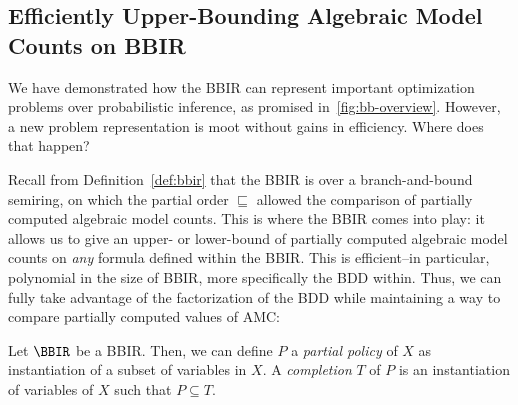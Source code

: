 \subsection{Efficiently Upper-Bounding Algebraic Model Counts on BBIR}
\label{subsec:bounds}

We have demonstrated how the BBIR can represent important optimization problems
over probabilistic inference, as promised in~\cref{fig:bb-overview}.
However, a new problem representation
is moot without
gains in efficiency. Where does that happen?

Recall from Definition~\ref{def:bbir}
that the BBIR is over a branch-and-bound semiring, on which the
partial order $\sqsubseteq$ allowed the comparison of partially computed
algebraic model counts.
This is where the BBIR comes into play: it allows us to give an
upper- or lower-bound of partially computed algebraic model counts
on \textit{any} formula defined within the BBIR.
This is efficient--in particular, polynomial in the size of BBIR, more specifically
the BDD within. Thus, we can fully take advantage of the factorization of the
BDD while maintaining a way to compare partially computed values of AMC:


\begin{definition}\label{def:partial policy}
  Let $\BBIR$ be a BBIR.
  Then, we can define $P$ a \emph{partial policy} of
  $X$ as instantiation of a subset of variables in $X$.
  A \textit{completion} $T$ of $P$ is an instantiation of variables of $X$
  such that $P \subseteq T$.
\end{definition}

